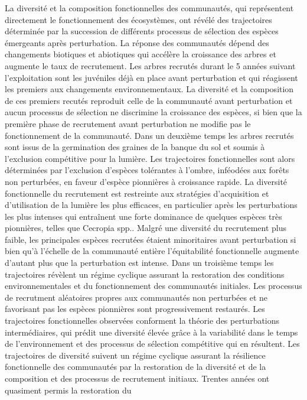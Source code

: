 \documentclass[
  11pt,
  french,
  A4paper,
  extrafontsizes,onecolumn,openright
  ]{memoir}
\begin{document}
La diversité et la composition fonctionnelles des communautés, qui
représentent directement le fonctionnement des écosystèmes, ont révélé
des trajectoires déterminée par la succession de différents processus de
sélection des espèces émergeants après perturbation. La réponse des
communautés dépend des changements biotiques et abiotiques qui accélère
la croissance des arbres et augmente le taux de recrutement. Les arbres
recrutés durant le 5 années suivant l'exploitation sont les juvéniles
déjà en place avant perturbation et qui réagissent les premiers aux
changements environnementaux. La diversité et la composition de ces
premiers recutés reproduit celle de la communauté avant perturbation et
aucun processus de sélection ne discrimine la croissance des espèces, si
bien que la première phase de recrutement avant perturbation ne modifie
pas le fonctionnement de la communauté. Dans un deuxième temps les
arbres recrutés sont issus de la germination des graines de la banque du
sol et soumis à l'exclusion compétitive pour la lumière. Les
trajectoires fonctionnelles sont alors déterminées par l'exclusion
d'espèces tolérantes à l'ombre, inféodées aux forêts non perturbées, en
faveur d'espèce pionnières à croissance rapide. La diversité
fonctionnelle du recrutement est restreinte aux stratégies d'acquisition
et d'utilisation de la lumière les plus efficaces, en particulier après
les perturbations les plus intenses qui entraînent une forte dominance
de quelques espèces très pionnières, telles que Cecropia spp.. Malgré
une diversité du recrutement plus faible, les principales espèces
recrutées étaient minoritaires avant perturbation si bien qu'à l'échelle
de la communauté entière l'équitabilité fonctionnelle augmente d'autant
plus que la perturbation est intense. Dans un troisième temps les
trajectoires révèlent un régime cyclique assurant la restoration des
conditions environnementales et du fonctionnement des communautés
initiales. Les processus de recrutment aléatoires propres aux
communautés non perturbées et ne favorisant pas les espèces pionnières
sont progressivement restaurés. Les trajectoires fonctionnelles
observées conforment la théorie des perturbations intermédiaires, qui
prédit une diversité élevée grâce à la variabilité dans le temps de
l'environnement et des processus de sélection compétitive qui en
résultent. Les trajectoires de diversité suivent un régime cyclique
assurant la résilience fonctionnelle des communautés par la restoration
de la diversité et de la composition et des processus de recrutement
initiaux. Trentes années ont quasiment permis la restoration du
\end{document}
